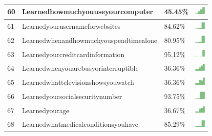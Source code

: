 \documentclass[a4paper,12pt]{article}
\begin{document}
\begin{longtable}{| p{0.5cm} | p{7cm} | p{1cm} | c |}
60 & Learnedhowmuchyouuseyourcomputer & 45.45\% & \includegraphics[width = 0.5cm, height = 0.5cm]{learnedhowmuchyouuseyourcomputerWORKCONTACTS} \\ \hline 
61 & Learnedyourusernameforwebsites & 84.62\% & \includegraphics[width = 0.5cm, height = 0.5cm]{learnedyourusernameforwebsitesWORKCONTACTS} \\ \hline 
62 & Learnedwhenandhowmuchyouspendtimealone & 80.95\% & \includegraphics[width = 0.5cm, height = 0.5cm]{learnedwhenandhowmuchyouspendtimealoneWORKCONTACTS} \\ \hline 
63 & Learnedyourcreditcardinformation & 95.12\% & \includegraphics[width = 0.5cm, height = 0.5cm]{learnedyourcreditcardinformationWORKCONTACTS} \\ \hline 
64 & Learnedwhenyouarebusyorinterruptible & 36.36\% & \includegraphics[width = 0.5cm, height = 0.5cm]{learnedwhenyouarebusyorinterruptibleWORKCONTACTS} \\ \hline 
65 & Learnedwhattelevisionshowsyouwatch & 36.36\% & \includegraphics[width = 0.5cm, height = 0.5cm]{learnedwhattelevisionshowsyouwatchWORKCONTACTS} \\ \hline 
66 & Learnedyoursocialsecuritynumber & 93.75\% & \includegraphics[width = 0.5cm, height = 0.5cm]{learnedyoursocialsecuritynumberWORKCONTACTS} \\ \hline 
67 & Learnedyourage & 36.67\% & \includegraphics[width = 0.5cm, height = 0.5cm]{learnedyourageWORKCONTACTS} \\ \hline 
68 & Learnedwhatmedicalconditionsyouhave & 85.29\% & \includegraphics[width = 0.5cm, height = 0.5cm]{learnedwhatmedicalconditionsyouhaveWORKCONTACTS} \\ \hline 

\end{longtable}
\end{document}
